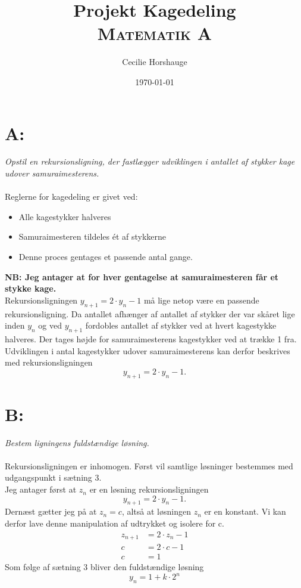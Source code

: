 \documentclass[a4paper, 11pt]{article}
\title{Projekt Kagedeling\\{\large \textsc{Matematik A}}}
\author{Cecilie Horshauge}
\date{\today}
\begin{document}
\maketitle

\section*{A:}
\textit{Opstil en rekursionsligning, der fastlægger udviklingen i antallet af stykker kage udover samuraimesterens.}\\\\
Reglerne for kagedeling er givet ved:
\begin{itemize}
    \item Alle kagestykker halveres
    \item Samuraimesteren tildeles ét af stykkerne
    \item Denne proces gentages et passende antal gange.
\end{itemize}
\textbf{NB: Jeg antager at for hver gentagelse at samuraimesteren får et stykke kage.}\\
Rekursionsligningen \(y_{n+1}=2 \cdot y_n -1\) må lige netop være en passende rekursionsligning. 
Da antallet afhænger af antallet af stykker der var skåret lige inden \(y_n\) og ved \(y_{n+1}\) fordobles antallet af stykker ved at hvert kagestykke halveres. Der tages højde for samuraimesterens kagestykker ved at trække 1 fra.\\
Udviklingen i antal kagestykker udover samuraimesterens kan derfor beskrives med rekursionsligningen
\[y_{n+1}=2 \cdot y_n -1.\]
\clearpage
\section*{B:}
\textit{Bestem ligningens fuldstændige løsning.}\\\\
Rekursionsligningen er inhomogen. Først vil samtlige  løsninger bestemmes med udgangspunkt i sætning 3.\\
Jeg antager først at \(z_n\) er en løsning rekursionsligningen
\[y_{n+1}=2 \cdot y_n -1.\]
Dernæst gætter jeg på at \(z_n=c\), altså at løsningen \(z_n\) er en konstant. Vi kan derfor lave denne manipulation af udtrykket og isolere for c.
\begin{align*}
    z_{n+1}&=2 \cdot z_n -1\\
    c&=2 \cdot c -1\\
    c&=1
\end{align*}
Som følge af sætning 3 bliver den fuldstændige løsning
\[y_{n}=1+k \cdot 2^n\] 
\clearpage
\end{document}

